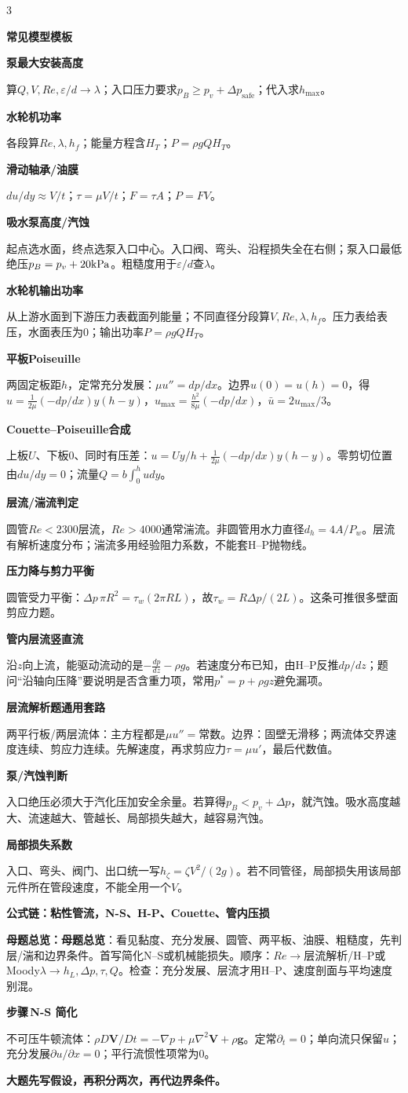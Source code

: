\documentclass[a4paper]{article}
\newcommand{\qt}[1]{\vspace{0.25pt}\colorbox{Q}{\parbox{\dimexpr\linewidth-2\fboxsep}{\color{white}\bfseries #1}}\par}
\newcommand{\ans}[1]{\colorbox{G}{\parbox{\dimexpr\linewidth-2\fboxsep}{#1}}\par}
\newcommand{\warn}[1]{\colorbox{Y}{\parbox{\dimexpr\linewidth-2\fboxsep}{\color{E}\bfseries #1}}\par}
\newcommand{\sect}[1]{\qt{#1}}
\newcommand{\exm}[1]{\qt{#1}}
\newcommand{\key}[1]{{\bfseries\color{M}#1}}
\newcommand{\labtag}[3]{{\bfseries\color{#1}\colorbox{#1}{\color{white}\fontsize{2.35}{2.48}\selectfont #2}\,#3}\par}
\newcommand{\step}[1]{\labtag{S}{步骤}{#1}}
\newcommand{\schemeviscous}{}
\newcommand{\mview}[1]{\ans{\textbf{母题总览：}#1}}
\newcommand{\stepq}[1]{\step{#1}}
\newenvironment{vfourWrap}{\par\begingroup\fontsize{2.68}{2.84}\selectfont\setlength{\fboxsep}{0.45pt}}{\par\endgroup}
\begin{document}
\begin{multicols}{3}
{\sect{常见模型模板}
\exm{泵最大安装高度}
算$Q,V,Re,\varepsilon/d\to\lambda$；入口压力要求$p_B\ge p_v+\Delta p_{\text{safe}}$；代入求$h_{\max}$。
\exm{水轮机功率}
各段算$Re,\lambda,h_f$；能量方程含$H_T$；$P=\rho gQH_T$。
\exm{滑动轴承/油膜}
$du/dy\approx V/t$；$\tau=\mu V/t$；$F=\tau A$；$P=FV$。
\exm{吸水泵高度/汽蚀}
起点选水面，终点选泵入口中心。入口阀、弯头、沿程损失全在右侧；泵入口最低绝压$p_B=p_v+20{\rm kPa}$。粗糙度用于$\varepsilon/d$查$\lambda$。
\exm{水轮机输出功率}
从上游水面到下游压力表截面列能量；不同直径分段算$V,Re,\lambda,h_f$。压力表给表压，水面表压为0；输出功率$P=\rho gQH_T$。
\sect{平板Poiseuille}
两固定板距$h$，定常充分发展：$\mu u''=dp/dx$。边界$u(0)=u(h)=0$，得$u=\frac{1}{2\mu}(-dp/dx)y(h-y)$，$u_{\max}=\frac{h^2}{8\mu}(-dp/dx)$，$\bar u=2u_{\max}/3$。
\sect{Couette--Poiseuille合成}
上板$U$、下板0、同时有压差：$u=Uy/h+\frac{1}{2\mu}(-dp/dx)y(h-y)$。零剪切位置由$du/dy=0$；流量$Q=b\int_0^h udy$。
\sect{层流/湍流判定}
圆管$Re<2300$层流，$Re>4000$通常湍流。非圆管用水力直径$d_h=4A/P_w$。层流有解析速度分布；湍流多用经验阻力系数，不能套H--P抛物线。
\sect{压力降与剪力平衡}
圆管受力平衡：$\Delta p\,\pi R^2=\tau_w(2\pi RL)$，故$\tau_w=R\Delta p/(2L)$。这条可推很多壁面剪应力题。
\sect{管内层流竖直流}
沿$z$向上流，能驱动流动的是$-\frac{dp}{dz}-\rho g$。若速度分布已知，由H--P反推$dp/dz$；题问“沿轴向压降”要说明是否含重力项，常用$p^*=p+\rho gz$避免漏项。
\sect{层流解析题通用套路}
两平行板/两层流体：主方程都是$\mu u''=$常数。边界：固壁无滑移；两流体交界速度连续、剪应力连续。先解速度，再求剪应力$\tau=\mu u'$，最后代数值。
\sect{泵/汽蚀判断}
入口绝压必须大于汽化压加安全余量。若算得$p_B<p_v+\Delta p$，就汽蚀。吸水高度越大、流速越大、管越长、局部损失越大，越容易汽蚀。
\sect{局部损失系数}
入口、弯头、阀门、出口统一写$h_\zeta=\zeta V^2/(2g)$。若不同管径，局部损失用该局部元件所在管段速度，不能全用一个$V$。
}

\qt{公式链：粘性管流，N-S、H-P、Couette、管内压损}
\begin{vfourWrap}
\mview{\key{母题总览}：看见黏度、充分发展、圆管、两平板、油膜、粗糙度，先判层/湍和边界条件。首写简化N--S或机械能损失。顺序：$Re\to$层流解析/H--P或Moody$\lambda\to h_L,\Delta p,\tau,Q$。检查：充分发展、层流才用H--P、速度剖面与平均速度别混。}
\schemeviscous
\stepq{N-S 简化}
不可压牛顿流体：$\rho D\bm V/Dt=-\nabla p+\mu\nabla^2\bm V+\rho\bm g$。定常$\partial_t=0$；单向流只保留$u$；充分发展$\partial u/\partial x=0$；平行流惯性项常为0。\\
\warn{大题先写假设，再积分两次，再代边界条件。}


\end{vfourWrap}
\end{multicols}
\end{document}
